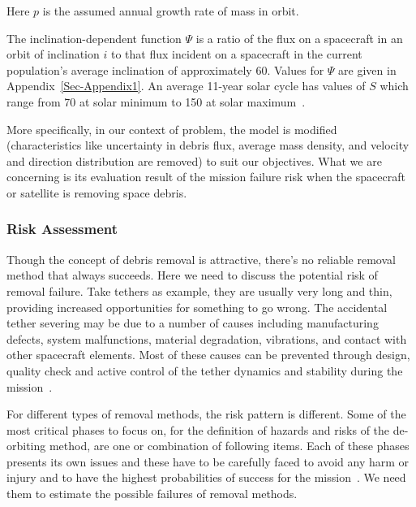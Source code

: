 \documentclass{mcmthesis}
\begin{document}
	Here $p$ is the assumed annual growth rate of mass in orbit.  %



	The inclination-dependent function $\Psi$ is a ratio of the flux on a spacecraft in an orbit of inclination $i$ to that flux incident on a spacecraft in the current population's average inclination of approximately 60. Values for $\Psi$ are given in Appendix~\ref{Sec-Appendix1}. An average 11-year solar cycle has values of $S$ which range from 70 at solar minimum to 150 at solar maximum~\cite{flux}.
	
	More specifically, in our context of problem, the model is modified (characteristics like uncertainty in debris flux, average mass density, and velocity and direction distribution are removed) to suit our objectives. What we are concerning is its evaluation result of the mission failure risk when the spacecraft or satellite is removing space debris.
	
\subsubsection{Risk Assessment}\label{Sec-Risk}
	
	Though the concept of debris removal is attractive, there's no reliable removal method that always succeeds. Here we need to discuss the potential risk of removal failure. Take tethers as example, they are usually very long and thin, providing increased opportunities for something to go wrong. The accidental tether severing may be due to a number of causes including manufacturing defects, system malfunctions, material degradation, vibrations, and contact with other spacecraft elements. Most of these causes can be prevented through design, quality check and active control of the tether dynamics and stability during the mission~\cite{Pardini}.
	
	For different types of removal methods, the risk pattern is different. Some of the most critical phases to focus on, for the definition of hazards and risks of the de-orbiting method, are one or combination of following items. Each of these phases presents its own issues and these have to be carefully faced to avoid any harm or injury and to have the highest probabilities of success for the mission~\cite{Andrenucci}. We need them to estimate the possible failures of removal methods.
	
\end{document}
